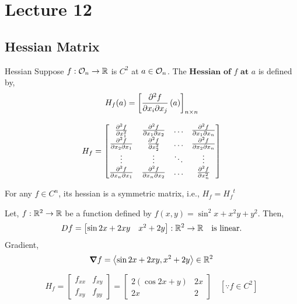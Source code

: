 \documentclass[../Analysis-3]{subfiles}
\begin{document}
\chapter*{Lecture 12} %
\setcounter{chapter}{12} %
\setcounter{section}{0}

\section{Hessian Matrix}

\begin{Def}{Hessian}{}
    Suppose $f : \mathcal{O}_{n} \to \mathbb{R}$ is $C^2$ at $a \in \mathcal{O}_{n} $. The $\textbf{Hessian of $f$ at $a$}$ is defined by, \[ H_f(a) = \left[ \pdv{f}{x_i}{x_j}\left( a \right) \right]_{n \times n} \]
\end{Def}

\[ H_{f} = \begin{bmatrix}
        \pdv[2]{f}{x_1}   & \pdv{f}{x_1}{x_2} & \ldots & \pdv{f}{x_1}{x_n} \\
        \pdv{f}{x_2}{x_1} & \pdv[2]{f}{x_2}   & \ldots & \pdv{f}{x_2}{x_n} \\
        \vdots            & \vdots            & \ddots & \vdots            \\
        \pdv{f}{x_n}{x_1} & \pdv{f}{x_n}{x_2} & \ldots & \pdv[2]{f}{x_n}
    \end{bmatrix} \]

\begin{noteBox}
    For any $ f \in C^n $, its hessian is a symmetric matrix, i.e., $H_f = {H_f}^t$
\end{noteBox}

\begin{Eg}{}{}
    Let, $f : \mathbb{R}^2 \to \mathbb{R}$ be a function defined by $f(x,y) = \sin^2 x + x^2y + y^2$. Then,
    \[Df = \begin{bmatrix}
            \sin2x + 2xy & x^2 + 2y
        \end{bmatrix} :  \mathbb{R}^2 \to \mathbb{R} \quad \text{is linear.} \]
    Gradient, \[\grad f = \left\langle \sin2x + 2xy, x^2 + 2y \right\rangle \in \mathbb{R}^2 \]

    \[ H_f = \begin{bmatrix}
            f_{xx} & f_{xy} \\
            f_{xy} & f_{yy}
        \end{bmatrix} = \begin{bmatrix}
            2( \cos2x + y) & 2x \\
            2x             & 2
        \end{bmatrix} \quad [ \because  f \in C^2] \]

\end{Eg}
\end{document}
